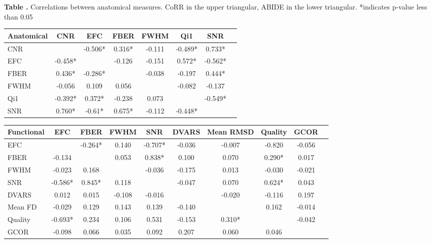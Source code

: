 \begin{table}[ht!]
\textbf{\label{tab_anat_cor} Table .}{ Correlations between anatomical measures. CoRR in the upper triangular, ABIDE in the lower triangular. *indicates p-value less than 0.05 }
\processtable{}
{\begin{tabular}{ l c c c c c c p{1.5cm}}\\
        \hline
         Anatomical & CNR & EFC & FBER & FWHM & Qi1 & SNR \\
        \hline
        CNR &  & -0.506* & 0.316* & -0.111 & -0.489* & 0.733* \\
        EFC & -0.458* &  & -0.126 & -0.151 & 0.572* & -0.562* \\
        FBER & 0.436* & -0.286* & & -0.038 & -0.197 & 0.444* \\
        FWHM & -0.056 & 0.109 & 0.056 & & -0.082 & -0.137 \\
        Qi1 & -0.392* & 0.372* & -0.238 & 0.073 & & -0.549* \\
        SNR & 0.760* & -0.61* & 0.675* & -0.112 & -0.448* & \\
        \hline
        \end{tabular}}{}
\end{table}

\begin{table}[h]
  \begin{center}
    \begin{tabular}{ l c c c c c c c c p{1.5cm}}
    \hline
    Functional & EFC & FBER & FWHM & SNR & DVARS & Mean RMSD & Quality & GCOR  \\ \hline
    EFC & & -0.264* & 0.140 & -0.707* & -0.036 & -0.007 & -0.820 & -0.056 \\
    FBER & -0.134 & & 0.053 & 0.838* & 0.100 & 0.070 & 0.290* & 0.017 \\
    FWHM & -0.023 & 0.168 & & -0.036 & -0.175 & 0.013 & -0.030 & -0.021 \\
    SNR & -0.586* & 0.845* & 0.118 & & -0.047 & 0.070 & 0.624* & 0.043 \\
    DVARS & 0.012 & 0.015 & -0.108 & -0.016 & & -0.020 & -0.116 & 0.197 \\
    Mean FD & -0.029 & 0.129 & 0.143 & 0.139 & -0.140 & & 0.162 & -0.014 \\
    Quality & -0.693* & 0.234 & 0.106 & 0.531 & -0.153 & 0.310* & & -0.042 \\
    GCOR & -0.098 & 0.066 & 0.035 & 0.092 & 0.207 & 0.060 & 0.046 & \\
    \hline
    \end{tabular}
  \end{center}
\end{table}

